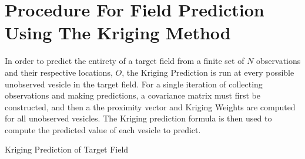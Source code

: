 \section{Procedure For Field Prediction Using The Kriging Method}
In order to predict the entirety of a target field from a finite set of $N$ observations and their respective locations, $O$, the Kriging Prediction is run at every possible unobserved vesicle in the target field. For a single iteration of collecting observations and making predictions, a covariance matrix must first be constructed, and then a the proximity vector and Kriging Weights are computed for all unobserved vesicles. The Kriging prediction formula is then used to compute the predicted value of each vesicle to predict.

\begin{algorithm}[thpb!]
\caption{Kriging Prediction of Target Field}\label{alg:krig}
\end{algorithm}
